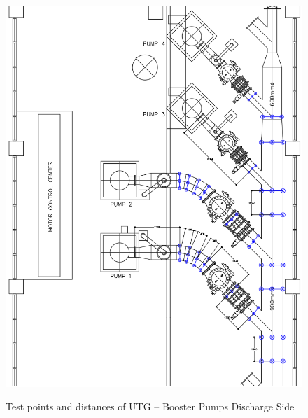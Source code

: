 \begin{figure}[!htb]
	\includegraphics[scale=0.5]{figures/ch04_fig_utgbp} \\
	\caption{Test points and distances of UTG – Booster Pumps Discharge Side}
	\label{ch04_fig_utgbp} 
\end{figure}



